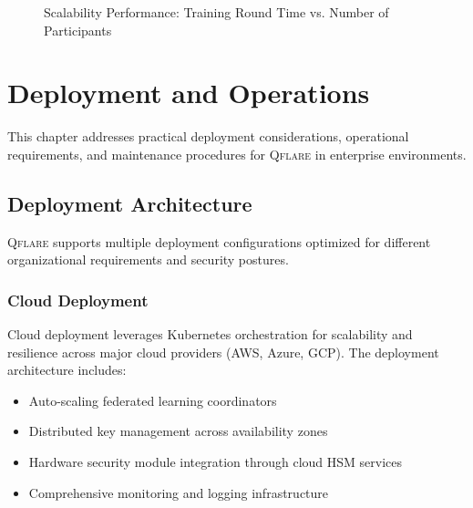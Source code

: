 ﻿\documentclass[12pt,a4paper,twoside]{book}
\newcommand{\qflare}{\textsc{Qflare}}
\begin{document}
\begin{figure}[htbp]
\centering
{}
\caption{Scalability Performance: Training Round Time vs. Number of Participants}
\label{fig:scalability}
\end{figure}

\chapter{Deployment and Operations}
\label{ch:deployment}

This chapter addresses practical deployment considerations, operational requirements, and maintenance procedures for \qflare{} in enterprise environments.

\section{Deployment Architecture}
\label{sec:deployment-architecture}

\qflare{} supports multiple deployment configurations optimized for different organizational requirements and security postures.

\subsection{Cloud Deployment}
\label{subsec:cloud-deployment}

Cloud deployment leverages Kubernetes orchestration for scalability and resilience across major cloud providers (AWS, Azure, GCP). The deployment architecture includes:

\begin{itemize}
\item Auto-scaling federated learning coordinators
\item Distributed key management across availability zones
\item Hardware security module integration through cloud HSM services
\item Comprehensive monitoring and logging infrastructure
\end{itemize}
\end{document}
